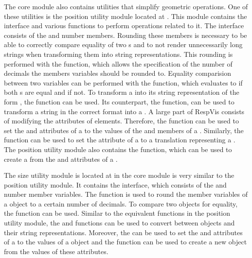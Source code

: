 The core module also contains utilities that simplify geometric operations.
One of these utilities is the position utility module located at .
This module contains the  interface and various functions to perform operations related to it.
The  interface consists of the  and  number members.
Rounding these members is necessary to be able to correctly compare equality of two s and to not render unnecessarily long strings when transforming them into string representations.
This rounding is performed with the  function, which allows the specification of the number of decimals the members variables should be rounded to.
Equality comparision between two  variables can be performed with the  function, which evaluates to  if both s are equal and  if not.
To transform a  into its string representation of the form , the  function can be used.
Its counterpart, the  function, can be used to transform a string in the correct format into a .
A large part of RespVis consists of modifying the attributes of elements.
Therefore, the  function can be used to set the  and  attributes of a  to the values of the  and  members of a .
Similarly, the  function can be used to set the  attribute of a  to a translation representing a .
The position utility module also contains the  function, which can be used to create a  from the  and  attributes of a .


The size utility module is located at  in the core module is very similar to the position utility module.
It contains the  interface, which consists of the  and  number member variables.
The  function is used to round the member variables of a  object to a certain number of decimals.
To compare two  objects for equality, the  function can be used.
Similar to the equivalent functions in the position utility module, the  and  functions can be used to convert between  objects and their string representations.
Moreover, the  can be used to set the  and  attributes of a  to the values of a  object and the  function can be used to create a new  object from the values of these attributes.

